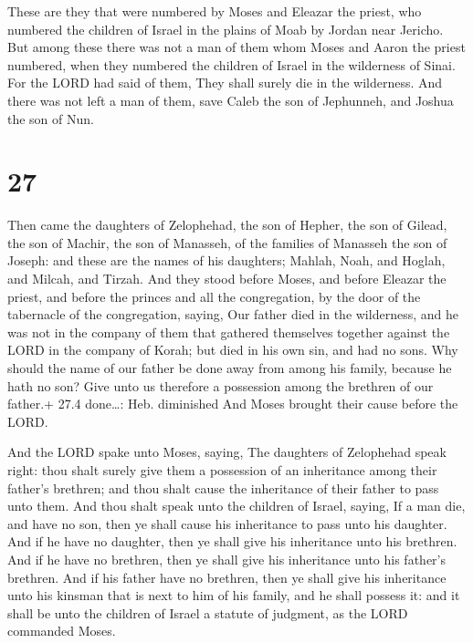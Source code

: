 These are they that were numbered by Moses and Eleazar
the priest, who numbered the children of Israel in the plains of Moab by
Jordan near Jericho.  But among these there was not a man
of them whom Moses and Aaron the priest numbered, when they numbered the
children of Israel in the wilderness of Sinai.  For the
LORD had said of them, They shall surely die in the wilderness. And
there was not left a man of them, save Caleb the son of Jephunneh, and
Joshua the son of Nun.

\hypertarget{section-26}{%
\section{27}\label{section-26}}

 Then came the daughters of Zelophehad, the son of Hepher,
the son of Gilead, the son of Machir, the son of Manasseh, of the
families of Manasseh the son of Joseph: and these are the names of his
daughters; Mahlah, Noah, and Hoglah, and Milcah, and Tirzah.
 And they stood before Moses, and before Eleazar the priest,
and before the princes and all the congregation, by the door of the
tabernacle of the congregation, saying,  Our father died in
the wilderness, and he was not in the company of them that gathered
themselves together against the LORD in the company of Korah; but died
in his own sin, and had no sons.  Why should the name of our
father be done away from among his family, because he hath no son? Give
unto us therefore a possession among the brethren of our father.+ 27.4
done\ldots: Heb. diminished  And Moses brought their cause
before the LORD.

 And the LORD spake unto Moses, saying,  The
daughters of Zelophehad speak right: thou shalt surely give them a
possession of an inheritance among their father's brethren; and thou
shalt cause the inheritance of their father to pass unto them.
 And thou shalt speak unto the children of Israel, saying,
If a man die, and have no son, then ye shall cause his inheritance to
pass unto his daughter.  And if he have no daughter, then ye
shall give his inheritance unto his brethren.  And if he
have no brethren, then ye shall give his inheritance unto his father's
brethren.  And if his father have no brethren, then ye
shall give his inheritance unto his kinsman that is next to him of his
family, and he shall possess it: and it shall be unto the children of
Israel a statute of judgment, as the LORD commanded Moses.

